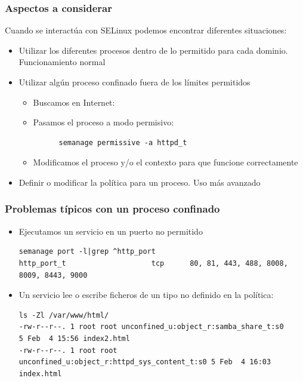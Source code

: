 \documentclass[aspectratio=169]{beamer}
\begin{document}
\begin{frame}[fragile]
  \frametitle{Aspectos a considerar}
  Cuando se interactúa con SELinux podemos encontrar diferentes situaciones:
  \begin{itemize}
  \item Utilizar los diferentes procesos dentro de lo permitido para
    cada dominio. Funcionamiento normal
  \item Utilizar algún proceso confinado fuera de los límites permitidos
    \begin{itemize}
    \item Buscamos en Internet: \texttt{}
    \item Pasamos el proceso a modo permisivo:
    \begin{lstlisting}
      semanage permissive -a httpd_t
    \end{lstlisting}
    \item Modificamos el proceso y/o el contexto para que funcione correctamente
    \end{itemize}
  \item Definir o modificar la política para un proceso. Uso más avanzado
  \end{itemize}
\end{frame}

\begin{frame}[fragile]
  \frametitle{Problemas típicos con un proceso confinado}
  \begin{itemize}
  \item Ejecutamos un servicio en un puerto no permitido
    \begin{lstlisting}[basicstyle=\scriptsize\ttfamily]
semanage port -l|grep ^http_port
http_port_t                    tcp      80, 81, 443, 488, 8008, 8009, 8443, 9000
    \end{lstlisting}
  \item Un servicio lee o escribe ficheros de un tipo no definido en la política:
    \begin{lstlisting}[basicstyle=\tiny\ttfamily]
ls -Zl /var/www/html/
-rw-r--r--. 1 root root unconfined_u:object_r:samba_share_t:s0       5 Feb  4 15:56 index2.html
-rw-r--r--. 1 root root unconfined_u:object_r:httpd_sys_content_t:s0 5 Feb  4 16:03 index.html
    \end{lstlisting}
  \end{itemize}
\end{frame}
\end{document}
